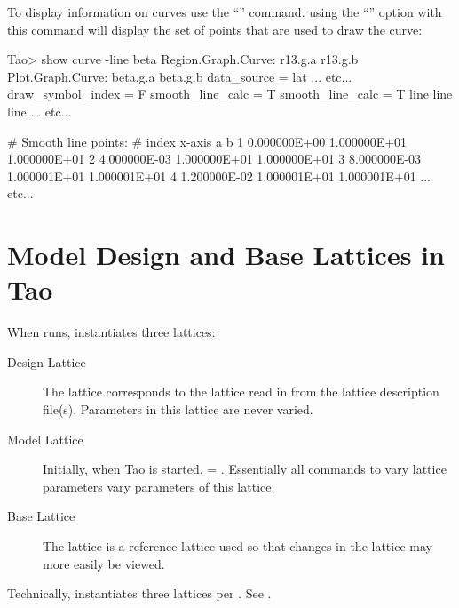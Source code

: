 \documentclass{hitec}
\newcommand{\Section}[1]{\section{#1}\vspace*{-1ex}}
\begin{document}
To display information on curves use the ``'' command. using the ``''
option with this command will display the set of points that are used to draw the curve:
\begin{code}
Tao> show curve -line beta
Region.Graph.Curve: r13.g.a
                    r13.g.b
Plot.Graph.Curve:   beta.g.a
                    beta.g.b
data_source          = lat
... etc...
draw_symbol_index    = F
smooth_line_calc     = T
smooth_line_calc     = T
line%
line%
line%
... etc...

# Smooth line points:
# index        x-axis             a             b
      1  0.000000E+00  1.000000E+01  1.000000E+01
      2  4.000000E-03  1.000000E+01  1.000000E+01
      3  8.000000E-03  1.000001E+01  1.000001E+01
      4  1.200000E-02  1.000001E+01  1.000001E+01
... etc...
\end{code}

\newpage

\Section{Model Design and Base Lattices in Tao}

When \tao runs, \tao instantiates three lattices:
\begin{description}
\item[Design Lattice] \Newline
The  lattice corresponds to the lattice read in from the lattice
description file(s). Parameters in this lattice are never varied.
\item[Model Lattice] \Newline
Initially, when Tao is started,  = . Essentially all commands to vary lattice
parameters vary parameters of this lattice.
\item[Base Lattice] \Newline
The  lattice is a reference lattice used so that changes in the  
lattice may more easily be viewed.
\end{description}

Technically, \tao instantiates three lattices per . See .
\end{document}
